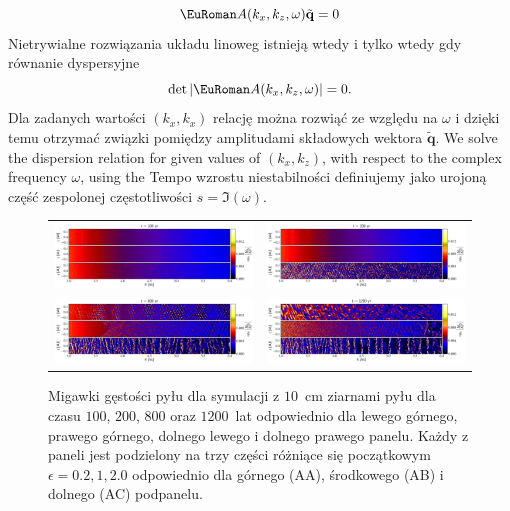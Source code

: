 \begin{equation}
 \eurom{A}(k_x,k_z,\omega)\tilde{\mathbf{q}} = 0
 \label{eq:linset}
\end{equation}
%
Nietrywialne rozwiązania układu linoweg  istnieją wtedy i tylko
wtedy gdy równanie dyspersyjne 
\begin{equation}
 \det|\eurom{A}(k_x,k_z,\omega)|=0.
 \label{eq:disprel}
\end{equation}
%
Dla zadanych wartości $(k_x, k_x)$ relację  można rozwiąć ze
względu na $\omega$ i dzięki temu otrzymać związki pomiędzy amplitudami
składowych wektora $\tilde{\mathbf{q}}$.
We solve the dispersion relation  for given values of
$(k_x,k_z)$, with respect to the complex frequency $\omega$, using the
Tempo wzrostu niestabilności definiujemy jako urojoną część zespolonej
częstotliwości $s=\Im(\omega)$.
%
\begin{figure}
   \centering
   \begin{tabular}{@{}cc@{}}
      \includegraphics[width=0.49\linewidth]{figures/fig2a} &
      \includegraphics[width=0.49\linewidth]{figures/fig2b} \\
      \includegraphics[width=0.49\linewidth]{figures/fig2c} &
      \includegraphics[width=0.49\linewidth]{figures/fig2d}
   \end{tabular}
   \caption{Migawki gęstości pyłu dla symulacji z $10$~cm ziarnami pyłu
      dla czasu $100$, $200$, $800$ oraz $1200$~lat odpowiednio dla lewego
      górnego, prawego górnego, dolnego lewego i dolnego prawego panelu.
      Każdy z paneli jest podzielony na trzy części różniące się początkowym 
      $\epsilon = 0.2, 1, 2.0$ odpowiednio dla górnego (AA), środkowego (AB) i
      dolnego (AC) podpanelu.}
   \label{fig2}
\end{figure}
